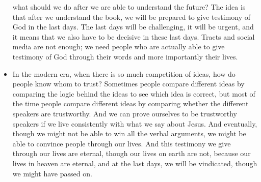\begin{itemize}
{  what should we do after we are able to understand the future?  The idea is
  that after we understand the book, we will be prepared to give testimony of
  God in the last days.  The last days will be challenging, it will be
  urgent, and it means that we also have to be decisive in these last days.
  Tracts and social media are not enough; we need people who are actually
  able to give testimony of God through their words and more importantly
  their lives.} 
  \item{In the modern era, when there is so much competition of
  ideas, how do people know whom to trust?  Sometimes people compare
  different ideas by comparing the logic behind the ideas to see which idea
  is correct, but most of the time people compare different ideas by
  comparing whether the different speakers are trustworthy.  And we can prove
  ourselves to be trustworthy speakers if we live consistently with what we
  say about Jesus.  And eventually, though we might not be able to win all
  the verbal arguments, we might be able to convince people through our
  lives.  And this testimony we give through our lives are eternal, though
  our lives on earth are not, because our lives in heaven are eternal, and at the last days, we will be vindicated, though we might have passed on.  }
\end{itemize}